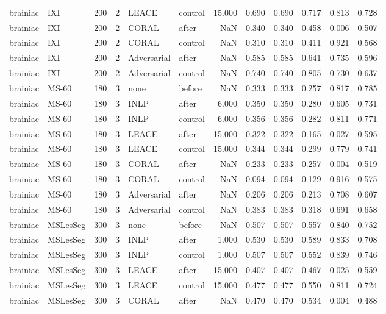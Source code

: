 \begin{tabular}{llrrllrrrrrr}
brainiac & IXI & 200 & 2 & LEACE & control & 15.000 & 0.690 & 0.690 & 0.717 & 0.813 & 0.728 \\
brainiac & IXI & 200 & 2 & CORAL & after & NaN & 0.340 & 0.340 & 0.458 & 0.006 & 0.507 \\
brainiac & IXI & 200 & 2 & CORAL & control & NaN & 0.310 & 0.310 & 0.411 & 0.921 & 0.568 \\
brainiac & IXI & 200 & 2 & Adversarial & after & NaN & 0.585 & 0.585 & 0.641 & 0.735 & 0.596 \\
brainiac & IXI & 200 & 2 & Adversarial & control & NaN & 0.740 & 0.740 & 0.805 & 0.730 & 0.637 \\
brainiac & MS-60 & 180 & 3 & none & before & NaN & 0.333 & 0.333 & 0.257 & 0.817 & 0.785 \\
brainiac & MS-60 & 180 & 3 & INLP & after & 6.000 & 0.350 & 0.350 & 0.280 & 0.605 & 0.731 \\
brainiac & MS-60 & 180 & 3 & INLP & control & 6.000 & 0.356 & 0.356 & 0.282 & 0.811 & 0.771 \\
brainiac & MS-60 & 180 & 3 & LEACE & after & 15.000 & 0.322 & 0.322 & 0.165 & 0.027 & 0.595 \\
brainiac & MS-60 & 180 & 3 & LEACE & control & 15.000 & 0.344 & 0.344 & 0.299 & 0.779 & 0.741 \\
brainiac & MS-60 & 180 & 3 & CORAL & after & NaN & 0.233 & 0.233 & 0.257 & 0.004 & 0.519 \\
brainiac & MS-60 & 180 & 3 & CORAL & control & NaN & 0.094 & 0.094 & 0.129 & 0.916 & 0.575 \\
brainiac & MS-60 & 180 & 3 & Adversarial & after & NaN & 0.206 & 0.206 & 0.213 & 0.708 & 0.607 \\
brainiac & MS-60 & 180 & 3 & Adversarial & control & NaN & 0.383 & 0.383 & 0.318 & 0.691 & 0.658 \\
brainiac & MSLesSeg & 300 & 3 & none & before & NaN & 0.507 & 0.507 & 0.557 & 0.840 & 0.752 \\
brainiac & MSLesSeg & 300 & 3 & INLP & after & 1.000 & 0.530 & 0.530 & 0.589 & 0.833 & 0.708 \\
brainiac & MSLesSeg & 300 & 3 & INLP & control & 1.000 & 0.507 & 0.507 & 0.552 & 0.839 & 0.746 \\
brainiac & MSLesSeg & 300 & 3 & LEACE & after & 15.000 & 0.407 & 0.407 & 0.467 & 0.025 & 0.559 \\
brainiac & MSLesSeg & 300 & 3 & LEACE & control & 15.000 & 0.477 & 0.477 & 0.550 & 0.811 & 0.724 \\
brainiac & MSLesSeg & 300 & 3 & CORAL & after & NaN & 0.470 & 0.470 & 0.534 & 0.004 & 0.488 \\

\end{tabular}
